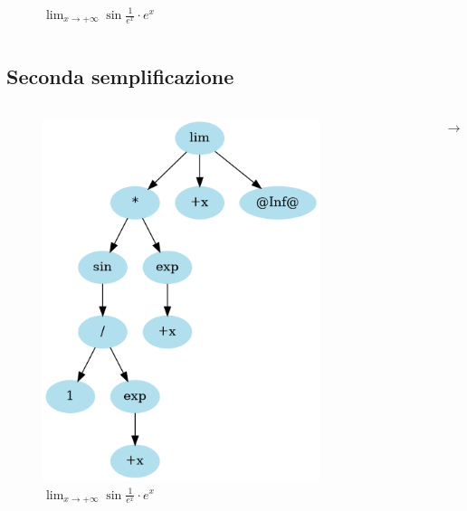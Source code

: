 \documentclass[aspectratio=149]{beamer}
\begin{document}
\begin{frame}
\begin{columns}
\begin{column}{0.45\textwidth}
\begin{figure}
					\caption{\(\lim_{x \to +\infty}{\sin{\frac{1}{e^{x}}} \cdot e^{x}}\)}
				\end{figure}
			\end{column}
		\end{columns}
	\end{frame}

	\subsection{Seconda semplificazione}
	
	\begin{frame}
		\begin{columns}
			\begin{column}{0.45\textwidth}
				\begin{figure}
					\includegraphics[width=0.8\textwidth]{pres_img/replaced.png}
					\caption{\(\lim_{x \to +\infty}{\sin{\frac{1}{e^{x}}} \cdot e^{x}}\)}
				\end{figure}
			\end{column}
			\begin{column}{0.1\textwidth}
				\begin{center}
					$\rightarrow$
				\end{center}
			\end{column}

\end{columns}
\end{frame}
\end{document}
